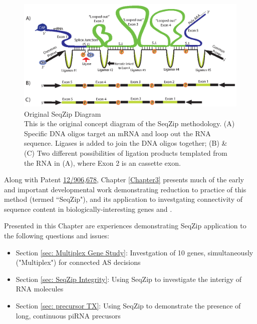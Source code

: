   \begin{figure}[htbp] %
    \centering 
    \includegraphics{Figures/Chapter2/OriginalSeqZipDiagram.eps}
    \caption[Original SeqZip Diagram]
    {
      Original SeqZip Diagram\\
      This is the original concept diagram of the SeqZip methodology. (A) Specific DNA oligos target an mRNA and loop out the RNA sequence. Ligases is added to join the DNA oligos together; (B) \& (C) Two different possibilities of ligation products templated from the RNA in (A), where Exon 2 is an cassette exon.
    	}
    \label{fig:Original SeqZip Diagram}
  	\end{figure}

  Along with Patent \href{http://1.usa.gov/PTG9BB}{12/906,678}, Chapter \ref{Chapter3} presents much of the early and important developmental work demonstrating reduction to practice of this method (termed ``SeqZip"), and its application to investgating connectivity of sequence content in biologically-interesting genes \fn{} and \dscam{}. 

  Presented in this Chapter are experiences demonstrating SeqZip application to the following questions and issues:

  \begin{itemize} %
    \item Section \ref{sec: Multiplex Gene Study}: Investgation of 10 genes, simultaneously ("Multiplex") for connected AS decisions
    \item Section \ref{sec: SeqZip Integrity}: Using SeqZip to investigate the interigy of RNA molecules
     \item Section \ref{sec: precursor TX}: Using SeqZip to demonstrate the presence of long, continuous piRNA precusors
	  \end{itemize}

